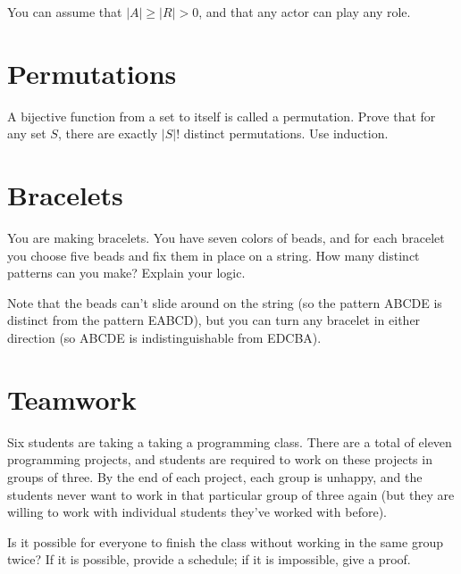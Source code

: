\documentclass{article}
\begin{document}
\noindent
You can assume that $|A| \geq |R| > 0$, and that any actor can play any role.


\section{Permutations}

A bijective function from a set to itself is called a permutation.
Prove that for any set $S$, there are exactly $|S|!$ distinct permutations.
Use induction.


\section{Bracelets}

You are making bracelets.
You have seven colors of beads, and for each bracelet you choose five beads and fix them in place on a string.
How many distinct patterns can you make?
Explain your logic.

\vspace{1em}
\begin{centering}
\par
\end{centering}
\vspace{1em}

\noindent
Note that the beads can't slide around on the string (so the pattern ABCDE is distinct from the pattern EABCD), but you can turn any bracelet in either direction (so ABCDE is indistinguishable from EDCBA).


\section{Teamwork}

Six students are taking a taking a programming class.
There are a total of eleven programming projects, and students are required to work on these projects in groups of three.
By the end of each project, each group is unhappy, and the students never want to work in that particular group of three again (but they are willing to work with individual students they've worked with before).

Is it possible for everyone to finish the class without working in the same group twice?
If it is possible, provide a schedule; if it is impossible, give a proof.
\end{document}
